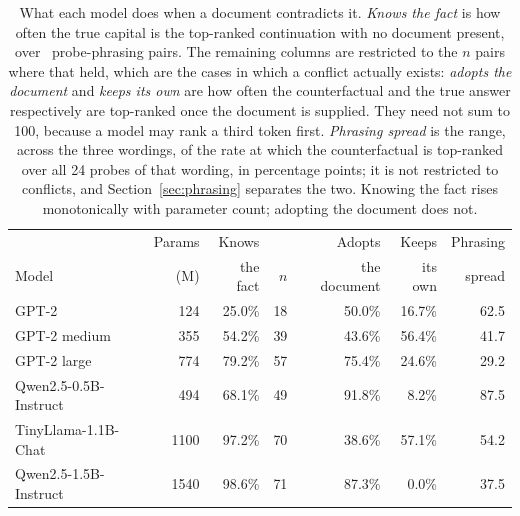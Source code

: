 \begin{table}[t]
\centering
\begin{tabular}{lrrrrrr}
\toprule
& Params & Knows & & Adopts & Keeps & Phrasing \\
Model & (M) & the fact & $n$ & the document & its own & spread \\
\midrule
GPT-2 & 124 & 25.0\% & 18 & 50.0\% & 16.7\% & 62.5 \\
GPT-2 medium & 355 & 54.2\% & 39 & 43.6\% & 56.4\% & 41.7 \\
GPT-2 large & 774 & 79.2\% & 57 & 75.4\% & 24.6\% & 29.2 \\
Qwen2.5-0.5B-Instruct & 494 & 68.1\% & 49 & 91.8\% & 8.2\% & 87.5 \\
TinyLlama-1.1B-Chat & 1100 & 97.2\% & 70 & 38.6\% & 57.1\% & 54.2 \\
Qwen2.5-1.5B-Instruct & 1540 & 98.6\% & 71 & 87.3\% & 0.0\% & 37.5 \\
\bottomrule
\end{tabular}
\caption{What each model does when a document contradicts it. \emph{Knows the fact} is how often the true capital is the top-ranked continuation with no document present, over \PerModel\ probe-phrasing pairs. The remaining columns are restricted to the $n$ pairs where that held, which are the cases in which a conflict actually exists: \emph{adopts the document} and \emph{keeps its own} are how often the counterfactual and the true answer respectively are top-ranked once the document is supplied. They need not sum to 100, because a model may rank a third token first. \emph{Phrasing spread} is the range, across the three wordings, of the rate at which the counterfactual is top-ranked over all 24 probes of that wording, in percentage points; it is not restricted to conflicts, and Section~\ref{sec:phrasing} separates the two. Knowing the fact rises monotonically with parameter count; adopting the document does not.}
\label{tab:results}
\end{table}
